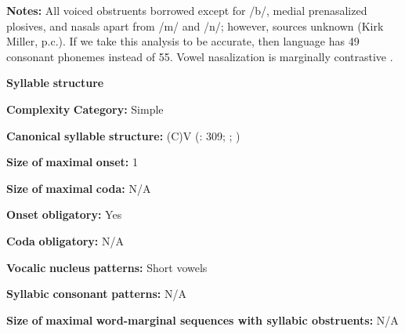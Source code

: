\begin{styleBody}
\textbf{Notes:} All voiced obstruents borrowed except for /b/, medial prenasalized plosives, and nasals apart from /m/ and /n/; however, sources unknown (Kirk Miller, p.c.). If we take this analysis to be accurate, then language has 49 consonant phonemes instead of 55. Vowel nasalization is marginally contrastive \citep[38]{Sands2013}.
\end{styleBody}

\begin{styleBody}
\textbf{Syllable} \textbf{structure}
\end{styleBody}

\begin{styleBody}
\textbf{Complexity} \textbf{Category:} Simple
\end{styleBody}

\begin{styleBody}
\textbf{Canonical} \textbf{syllable} \textbf{structure:} (C)V (\citealt{TuckerEtAl1977}: 309; \citealt{SandsEtAl1996}; \citealt{Sands2013})
\end{styleBody}

\begin{styleBody}
\textbf{Size} \textbf{of} \textbf{maximal} \textbf{onset:} 1
\end{styleBody}

\begin{styleBody}
\textbf{Size} \textbf{of} \textbf{maximal} \textbf{coda:} N/A
\end{styleBody}

\begin{styleBody}
\textbf{Onset} \textbf{obligatory:} Yes
\end{styleBody}

\begin{styleBody}
\textbf{Coda} \textbf{obligatory:} N/A
\end{styleBody}

\begin{styleBody}
\textbf{Vocalic} \textbf{nucleus} \textbf{patterns:} Short vowels
\end{styleBody}

\begin{styleBody}
\textbf{Syllabic} \textbf{consonant} \textbf{patterns:} N/A
\end{styleBody}

\begin{styleBody}
\textbf{Size} \textbf{of} \textbf{maximal} \textbf{word{}-marginal sequences with syllabic obstruents:} N/A
\end{styleBody}

